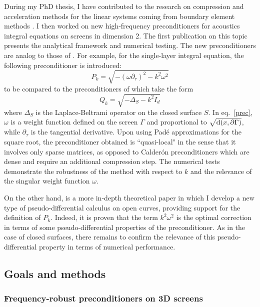 \documentclass[]{article}
\begin{document}
During my PhD thesis, I have contributed to the research on compression and acceleration methods for the linear systems coming from boundary element methods \cite{averseng2017fast}. I then worked on new high-frequency preconditioners for acoustics integral equations on screens in dimension 2. The first publication on this topic \cite{alouges2019new} presents the analytical framework and numerical testing. The new preconditioners are analog to those of \cite{antoine2007generalized}. For example, for the single-layer integral equation, the following preconditioner is introduced: 
\begin{equation}
\label{prec}
P_k = \sqrt{-(\omega \partial_\tau)^2 - k^2 \omega^2}
\end{equation}
to be compared to the preconditioners of \cite{antoine2007generalized} which take the form
\[Q_k = \sqrt{-\Delta_S - k^2 I_d}\]
where $\Delta_S$ is the Laplace-Beltrami operator on the closed surface $S$. 
In eq.~\eqref{prec}, $\omega$ is a weight function defined on the screen $\Gamma$ and proportional to $\sqrt{\textup{d}(x,\partial \Gamma)}$, while $\partial_\tau$ is the tangential derivative.
Upon using Padé approximations for the square root, the preconditioner obtained is ``quasi-local" in the sense that it involves only sparse matrices, as opposed to Calder\'{o}n preconditioners which are dense and require an additional compression step. The numerical tests demonstrate the robustness of the method with respect to $k$ and the relevance of the singular weight function $\omega$. 

On the other hand, \cite{averseng2019pseudo} is a more in-depth theoretical paper in which I develop a new type of pseudo-differential calculus on open curves, providing support for the definition of $P_k$. Indeed, it is proven that the term $k^2 \omega^2$ is the optimal correction in terms of some pseudo-differential properties of the preconditioner. As in the case of closed surfaces, there remains to confirm the relevance of this pseudo-differential property in terms of numerical performance.  



\subsection*{Goals and methods}


\subsubsection*{Frequency-robust preconditioners on 3D screens}
\end{document}
